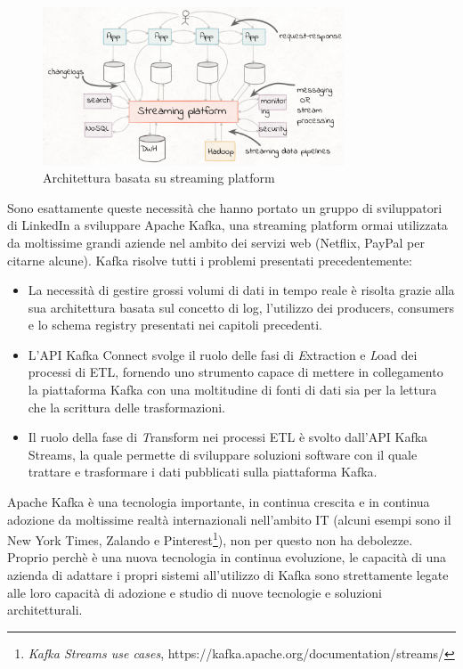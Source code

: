\documentclass[]{article}
\providecommand{\tightlist}{%
  \setlength{\itemsep}{0pt}\setlength{\parskip}{0pt}}
\begin{document}
\begin{figure}
\centering
\includegraphics[width=0.80000\textwidth]{../images/streaming-platform.png}
\caption{Architettura basata su streaming platform \label{figure_5}}
\end{figure}

Sono esattamente queste necessità che hanno portato un gruppo di
sviluppatori di LinkedIn a sviluppare Apache Kafka, una streaming
platform ormai utilizzata da moltissime grandi aziende nel ambito dei
servizi web (Netflix, PayPal per citarne alcune). Kafka risolve tutti i
problemi presentati precedentemente:

\begin{itemize}
\tightlist
\item
  La necessità di gestire grossi volumi di dati in tempo reale è risolta
  grazie alla sua architettura basata sul concetto di log, l'utilizzo
  dei producers, consumers e lo schema registry presentati nei capitoli
  precedenti.
\item
  L'API Kafka Connect svolge il ruolo delle fasi di \emph{E}xtraction e
  \emph{L}oad dei processi di ETL, fornendo uno strumento capace di
  mettere in collegamento la piattaforma Kafka con una moltitudine di
  fonti di dati sia per la lettura che la scrittura delle
  trasformazioni.
\item
  Il ruolo della fase di \emph{T}ransform nei processi ETL è svolto
  dall'API Kafka Streams, la quale permette di sviluppare soluzioni
  software con il quale trattare e trasformare i dati pubblicati sulla
  piattaforma Kafka.
\end{itemize}

\newpage

Apache Kafka è una tecnologia importante, in continua crescita e in
continua adozione da moltissime realtà internazionali nell'ambito IT
(alcuni esempi sono il New York Times, Zalando e Pinterest\footnote{\emph{Kafka
  Streams use cases}, https://kafka.apache.org/documentation/streams/}),
non per questo non ha debolezze. Proprio perchè è una nuova tecnologia
in continua evoluzione, le capacità di una azienda di adattare i propri
sistemi all'utilizzo di Kafka sono strettamente legate alle loro
capacità di adozione e studio di nuove tecnologie e soluzioni
architetturali.
\end{document}
